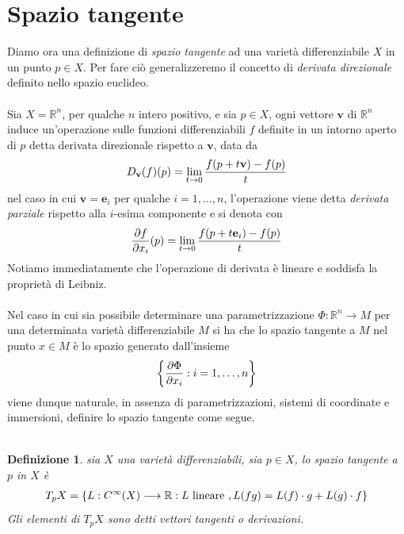 \documentclass[oneside, 11pt]{amsbook}
\newcommand{\0}{{(0)}}
\newcommand{\3}{{(3)}}
\theoremstyle{colonplain}
\theoremstyle{colondefinition}
\newtheorem{defn}[thm]{Definizione}
\theoremstyle{colonremark}
\numberwithin{equation}{chapter}
\begin{document}
\section{Spazio tangente}
Diamo ora una definizione di \textit{spazio tangente} ad una varietà differenziabile $X$ in un punto $p \in X$. Per fare ciò generalizzeremo il concetto di \textit{derivata direzionale} definito nello spazio euclideo. \\ \\
Sia $X = \mathbb{R}^n$, per qualche $n$ intero positivo, e sia $p \in X$, ogni vettore $\mathbf{v}$ di $\mathbb{R}^n$ induce un'operazione sulle funzioni differenziabili $f$ definite in un intorno aperto di $p$ detta derivata direzionale rispetto a $\mathbf{v}$, data da
\begin{align}
    D_{\mathbf{v}}(f)(p) = \lim_{t \rightarrow 0} \frac{f(p + t\mathbf{v}) - f(p)}{t} \notag
\end{align}
nel caso in cui $\mathbf{v} = \mathbf{e}_i$ per qualche $i = 1, \dots, n$, l'operazione viene detta \textit{derivata parziale} rispetto alla $i$-esima componente e si denota con
\begin{align}
    \frac{\partial f}{\partial x_i}(p) = \lim_{t \rightarrow 0} \frac{f(p + t\mathbf{e}_i) - f(p)}{t} \notag
\end{align}
Notiamo immediatamente che l'operazione di derivata è lineare e soddisfa la proprietà di Leibniz. \\ \\
Nel caso in cui sia possibile determinare una parametrizzazione $\Phi : \mathbb{R}^n \longrightarrow M$ per una determinata varietà differenziabile $M$ si ha che lo spazio tangente a $M$ nel punto $x \in M$ è lo spazio generato dall'insieme
\begin{align}
    \left\{ \frac{\partial \Phi}{\partial x_i} : i = 1, \dots, n \right\} \notag
\end{align}
viene dunque naturale, in assenza di parametrizzazioni, sistemi di coordinate e immersioni, definire lo spazio tangente come segue. \\ \\
\begin{defn} sia $X$ una varietà differenziabili, sia $p \in X$, lo \textit{spazio tangente} a $p$ in $X$ è
\begin{align}
    T_pX = \{ L : C^{\infty}(X) \longrightarrow \mathbb{R} : L \text{ lineare }, L(fg) = L(f) \cdot g + L(g) \cdot f \} \notag
\end{align}
Gli elementi di $T_pX$ sono detti \textit{vettori tangenti} o \textit{derivazioni}. \\ \\
\end{defn}
\end{document}
